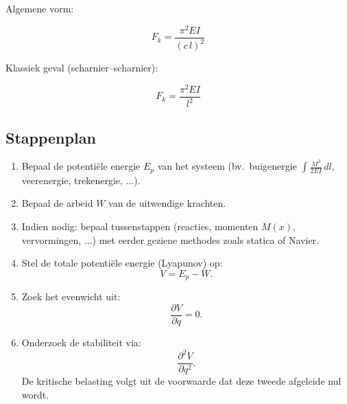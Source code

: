 \documentclass[a4paper,11pt]{article}
\begin{document}
\noindent
\begin{minipage}[t]{0.42\textwidth}
\noindent Algemene vorm:

\vspace{0.8em}

\begin{equation}
F_k = \frac{\pi^2 EI}{(c\,l)^2}
\end{equation}

\end{minipage}
\hfill
\begin{minipage}[t]{0.45\textwidth}
\noindent Klassiek geval (scharnier--scharnier):

\vspace{0.8em}

\begin{equation}
F_k = \frac{\pi^2 EI}{l^2}
\end{equation}
\end{minipage}



\newpage

\subsection*{Stappenplan}

\begin{enumerate}
    \item Bepaal de potentiële energie $E_p$ van het systeem 
    (bv.\ buigenergie $\int \frac{M^2}{2EI}\,dl$, veerenergie, trekenergie, ...).
    
    \item Bepaal de arbeid $W$ van de uitwendige krachten.

    \item Indien nodig: bepaal tussenstappen (reacties, momenten $M(x)$, vervormingen, ...) 
    met eerder geziene methodes zoals statica of Navier.
    
    
    \item Stel de totale potentiële energie (Lyapunov) op:
    \[
    V = E_p - W.
    \]
    
    \item Zoek het evenwicht uit:
    \[
    \frac{\partial V}{\partial q} = 0.
    \]
    
    \item Onderzoek de stabiliteit via:
    \[
    \frac{\partial^2 V}{\partial q^2}.
    \]
    De kritische belasting volgt uit de voorwaarde dat deze tweede afgeleide nul wordt.
\end{enumerate}
\end{document}
